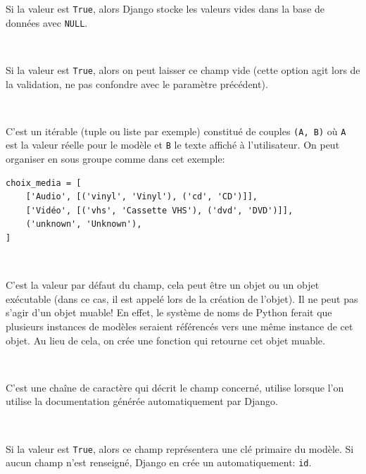 \documentclass[a4paper, 10pt]{article}
\begin{document}
{\begin{description}
    Si la valeur est \texttt{True}, alors Django stocke les valeurs vides dans la base de données avec \texttt{NULL}.

    \item[\texttt{blank=False}]~

    Si la valeur est \texttt{True}, alors on peut laisser ce champ vide (cette option agit lors de la validation, ne pas confondre avec le paramètre précédent).

    \item[\texttt{choices}]~

    C'est un itérable (tuple ou liste par exemple) constitué de couples \texttt{(A, B)} où \texttt{A} est la valeur réelle pour le modèle et \texttt{B} le texte affiché à l'utilisateur. On peut organiser en sous groupe comme dans cet exemple:

    \begin{verbatim}
choix_media = [
    ['Audio', [('vinyl', 'Vinyl'), ('cd', 'CD')]],
    ['Vidéo', [('vhs', 'Cassette VHS'), ('dvd', 'DVD')]],
    ('unknown', 'Unknown'),
]
    \end{verbatim}

    \item[\texttt{default}]~

    C'est la valeur par défaut du champ, cela peut être un objet ou un objet exécutable (dans ce cas, il est appelé lors de la création de l'objet). Il ne peut pas s'agir d'un objet muable! En effet, le système de noms de Python ferait que plusieurs instances de modèles seraient référencés vers une même instance de cet objet. Au lieu de cela, on crée une fonction qui retourne cet objet muable.

    \item[\texttt{help_text}]~

    C'est une chaîne de caractère qui décrit le champ concerné, utilise lorsque l'on utilise la documentation générée automatiquement par Django.

    \item[\texttt{primary_key}]~

    Si la valeur est \texttt{True}, alors ce champ représentera une clé primaire du modèle. Si aucun champ n'est renseigné, Django en crée un automatiquement: \texttt{id}.

    \item[\texttt{verbose_name}]~


\end{description}}
\end{document}

